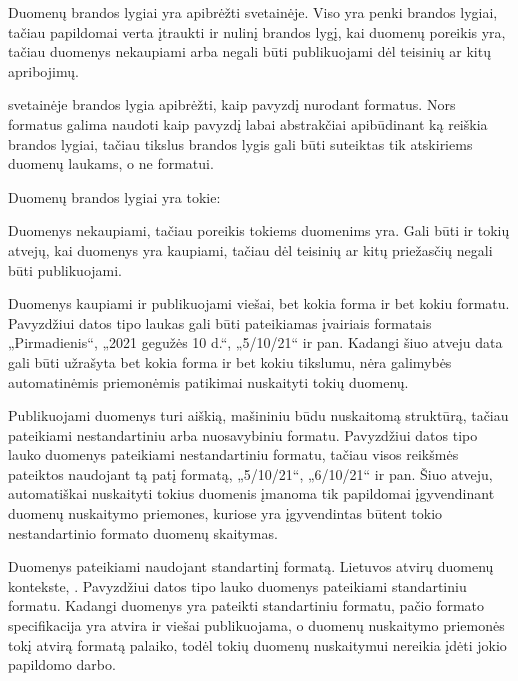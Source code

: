 \documentclass[letterpaper,10pt,lithuanian]{sphinxmanual}
\begin{document}
\begin{description}
\sphinxAtStartPar
Duomenų brandos lygiai yra apibrėžti  svetainėje.
Viso yra penki brandos lygiai, tačiau papildomai verta įtraukti ir
nulinį brandos lygį, kai duomenų poreikis yra, tačiau duomenys
nekaupiami arba negali būti publikuojami dėl teisinių ar kitų
apribojimų.

\sphinxAtStartPar
{} svetainėje brandos lygia apibrėžti, kaip pavyzdį
nurodant formatus. Nors formatus galima naudoti kaip pavyzdį labai
abstrakčiai apibūdinant ką reiškia brandos lygiai, tačiau tikslus
brandos lygis gali būti suteiktas tik atskiriems duomenų  laukams, o
ne formatui.

\sphinxAtStartPar
Duomenų brandos lygiai yra tokie:
\begin{description}
\sphinxAtStartPar
Duomenys nekaupiami, tačiau poreikis tokiems duomenims yra. Gali
būti ir tokių atvejų, kai duomenys yra kaupiami, tačiau dėl teisinių
ar kitų priežasčių negali būti publikuojami.

\sphinxAtStartPar
Duomenys kaupiami ir publikuojami viešai, bet kokia forma ir bet
kokiu formatu. Pavyzdžiui datos tipo laukas gali būti pateikiamas
įvairiais formatais „Pirmadienis“, „2021 gegužės 10 d.“,
„5/10/21“ ir pan. Kadangi šiuo atveju data gali būti užrašyta bet
kokia forma ir bet kokiu tikslumu, nėra galimybės automatinėmis
priemonėmis patikimai nuskaityti tokių duomenų.

\sphinxAtStartPar
Publikuojami duomenys turi aiškią, mašininiu būdu nuskaitomą
struktūrą, tačiau pateikiami nestandartiniu arba nuosavybiniu
formatu. Pavyzdžiui datos tipo lauko duomenys pateikiami
nestandartiniu formatu, tačiau visos reikšmės pateiktos naudojant tą
patį formatą, „5/10/21“, „6/10/21“ ir pan. Šiuo atveju, automatiškai
nuskaityti tokius duomenis įmanoma tik papildomai įgyvendinant
duomenų nuskaitymo priemones, kuriose yra įgyvendintas būtent tokio
nestandartinio formato duomenų skaitymas.

\sphinxAtStartPar
Duomenys pateikiami naudojant standartinį formatą. Lietuvos atvirų
duomenų kontekste, {\hyperref[\detokenize{tipai:duomenu-tipai}]{}}.
Pavyzdžiui datos tipo lauko duomenys pateikiami standartiniu  formatu. Kadangi duomenys yra pateikti standartiniu formatu,
pačio formato specifikacija yra atvira ir viešai publikuojama, o
duomenų nuskaitymo priemonės tokį atvirą formatą palaiko, todėl
tokių duomenų nuskaitymui nereikia įdėti jokio papildomo darbo.


\end{description}
\end{description}
\end{document}
